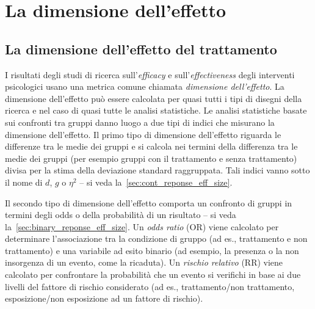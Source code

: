 \chapter{La dimensione dell'effetto}
\label{ch:effect_size}


\section{La dimensione dell'effetto del trattamento}

I risultati degli studi di ricerca sull'\emph{efficacy} e sull'\emph{effectiveness} degli interventi psicologici usano una metrica comune chiamata \emph{dimensione dell'effetto}.
La dimensione dell'effetto può essere calcolata per quasi tutti i tipi di disegni della ricerca e nel caso di quasi tutte le analisi statistiche. 
Le analisi statistiche basate sui confronti tra gruppi danno luogo a due tipi di indici che misurano la dimensione dell'effetto. 
Il primo tipo di dimensione dell'effetto riguarda le differenze tra le medie dei gruppi e si calcola nei termini della differenza tra le medie dei gruppi (per esempio gruppi con il trattamento e senza trattamento) divisa per la stima della deviazione standard raggruppata. 
Tali indici vanno sotto il nome di $d$, $g$ o $\eta^2$ -- si veda la~\ref{sec:cont_reponse_eff_size}. 

Il secondo tipo di dimensione dell'effetto comporta un confronto di gruppi in termini degli odds o della probabilità di un risultato -- si veda la~\ref{sec:binary_reponse_eff_size}.
Un \emph{odds ratio} (OR) viene calcolato per determinare l'associazione tra la condizione di gruppo (ad es., trattamento e non trattamento) e una variabile ad esito binario (ad esempio, la presenza o la non insorgenza di un evento, come la ricaduta). 
Un \emph{rischio relativo} (RR) viene calcolato per confrontare la probabilità che un evento si verifichi in base ai due livelli del fattore di rischio considerato (ad es., trattamento/non trattamento, esposizione/non esposizione ad un fattore di rischio).

